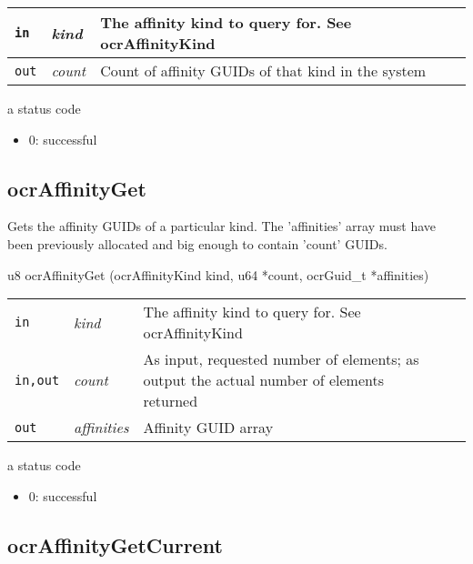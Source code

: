 \begin{table}[h]
\begin{tabular}{l l l}
\hline
\mbox{\tt in}  & {\em kind} & The affinity kind to query for. See {ocr\-Affinity\-Kind} \\
\hline
\mbox{\tt out}  & {\em count} & Count of affinity G\-U\-I\-Ds of that kind in the system \\
\hline
\end{tabular}
\end{table}

\returns
a status code
\begin{itemize}
\item 0\-: successful
\end{itemize}



\subsection{ocr\-Affinity\-Get}
\summary
Gets the affinity G\-U\-I\-Ds of a particular kind. The 'affinities' array must have been previously allocated and big enough to contain 'count' G\-U\-I\-Ds.

\begin{boxedcode}
 u8 ocrAffinityGet (ocrAffinityKind kind,  u64 *count,
                              ocrGuid\_t *affinities)
\end{boxedcode}


\begin{table}[h]
\begin{tabular}{p{0.7in} p{0.75in} p{3.5in} l l}
\hline
\mbox{\tt in}         & {\em kind}        & The affinity kind to query for. See ocr\-Affinity\-Kind \\

\mbox{\tt in,out}  & {\em count}     &  As input, requested number of elements; as output the actual number of elements returned \\

\mbox{\tt out}     & {\em affinities} & Affinity G\-U\-I\-D array \\
\hline
\end{tabular}
\end{table}

\returns
a status code
\begin{itemize}
\item 0\-: successful
\end{itemize}

\subsection{ocr\-Affinity\-Get\-Current}

